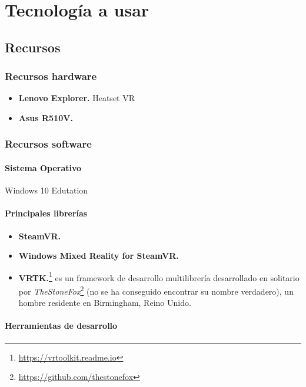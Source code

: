\chapter{Tecnología a usar}
\label{chap:tecnologia}

\section{Recursos}

\subsection{Recursos hardware}

\begin{itemize}
 \item \textbf{Lenovo Explorer.} Heatset VR
 \item \textbf{Asus R510V.}
\end{itemize}

\subsection{Recursos software}

\subsubsection{Sistema Operativo}

Windows 10 Edutation 

\subsubsection{Principales librerías}

\begin{itemize}
    \item \textbf{SteamVR.}
    \item \textbf{Windows Mixed Reality for SteamVR.}
    \item \textbf{VRTK.}\footnote{\url{https://vrtoolkit.readme.io}} es un framework de desarrollo multilibrería desarrollado en solitario por \textit{TheStoneFox}\footnote{\url{https://github.com/thestonefox}} (no se ha conseguido encontrar su nombre verdadero), un hombre residente en Birmingham, Reino Unido.
\end{itemize}

\subsubsection{Herramientas de desarrollo}

